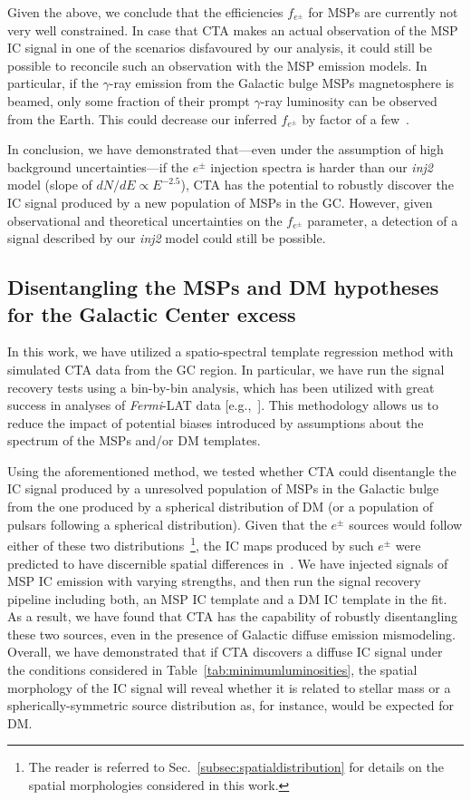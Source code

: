 \documentclass[doublespace,draft,nopageskip]{VTthesis} %
\begin{document}
 

Given the above, 
we conclude that the efficiencies $f_{e^{\pm}}$ for MSPs are currently not very well constrained. In case that CTA makes an actual observation of the MSP IC signal in one of the scenarios disfavoured by our analysis, it could still be possible to reconcile such an observation with the MSP emission models. In particular, if the $\gamma$-ray emission from the Galactic bulge MSPs magnetosphere is beamed, only some fraction of their prompt $\gamma$-ray luminosity can be observed from the Earth. This could decrease our inferred $f_{e^{\pm}}$ by factor of a few~\citep{Sudoh:2020hyu}.  

In conclusion, we have demonstrated that---even under the assumption of high background uncertainties---if the $e^\pm$ injection spectra is harder than our \textit{inj2} model (slope of $dN/dE \propto E^{-2.5}$),  CTA has the potential to robustly discover the IC signal produced by a new population of MSPs in the GC. However, given observational and theoretical uncertainties on the $f_{e^{\pm}}$ parameter, a detection of a signal described by our \textit{inj2} model could still be possible. 


\subsection{Disentangling the MSPs and DM hypotheses for the Galactic Center excess}
\label{subsec:disentanglingMSPsfromDM}

In this work, we have utilized a spatio-spectral template regression method with simulated CTA data from the GC region. In particular, we have run the signal recovery tests using a bin-by-bin analysis, which has been utilized with great success in analyses of \textit{Fermi}-LAT data [e.g.,~\citep{Ackermann:2015zua,TheFermi-LAT:2017vmf}]. This methodology allows us to reduce the impact of potential biases introduced by assumptions about the spectrum of the MSPs and/or DM templates.
 

Using the aforementioned method, we tested whether CTA could disentangle the IC signal produced by a unresolved population of MSPs in the Galactic bulge from the one produced by a spherical distribution of DM (or a population of pulsars following a spherical distribution). Given that the $e^\pm$ sources would follow either of these two distributions~\footnote{The reader is referred to Sec.~\ref{subsec:spatialdistribution} for details on the spatial morphologies considered in this work.}, the IC maps produced by such $e^\pm$ were predicted to have discernible spatial differences in~\cite{Song:2019nrx}. We have injected signals of MSP IC emission with varying strengths, and then run the signal recovery pipeline including both, an MSP IC template and a DM IC template in the fit. As a result, we have found that CTA has the capability of robustly disentangling these two sources, even in the presence of Galactic diffuse emission mismodeling. Overall, we have demonstrated that if CTA discovers a diffuse IC signal under the conditions considered in Table~\ref{tab:minimumluminosities}, the spatial morphology of the IC signal will reveal whether it is related to stellar mass or a spherically-symmetric source distribution as, for instance, would be expected for DM.
\end{document}
